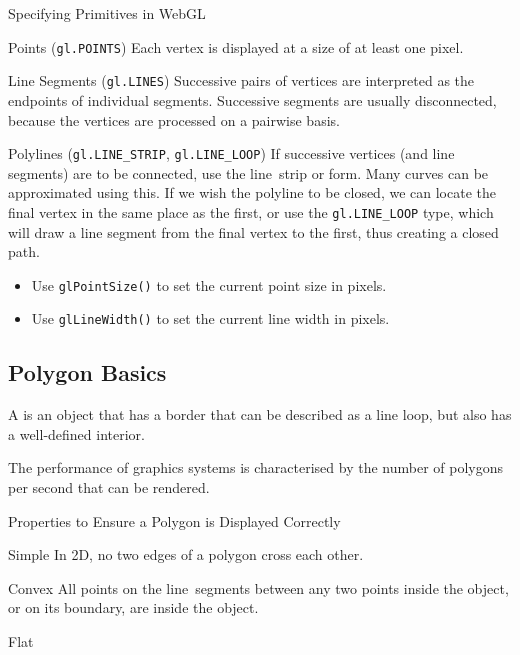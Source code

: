 \documentclass[../notes.tex]{subfiles}
\begin{document}
      \begin{sidenote}{Specifying Primitives in WebGL}
        $ $\vspace{-1em}
        \begin{descriptimize}
          \item[Points (\texttt{gl.POINTS})] Each vertex is displayed
            at a size of at least one pixel.
          \item[Line Segments (\texttt{gl.LINES})] Successive pairs of vertices
            are interpreted as the endpoints of individual segments.
            Successive segments are usually disconnected, because the vertices are processed
            on a pairwise basis.
          \item[Polylines (\texttt{gl.LINE_STRIP}, \texttt{gl.LINE_LOOP})]
            If successive vertices (and line segments) are to be connected,
            use the line~strip or  form.
            Many curves can be approximated using this.
            If we wish the polyline to be closed,
            we can locate the final vertex in the same place as the first,
            or use the \texttt{gl.LINE_LOOP} type,
            which will draw a line segment from the final vertex to the first,
            thus creating a closed path.
        \end{descriptimize}

        \begin{itemize}[nosep]
          \item Use \texttt{glPointSize()} to set the current point size in pixels.
          \item Use \texttt{glLineWidth()} to set the current line width in pixels.
        \end{itemize}
      \end{sidenote}

      \subsection{Polygon Basics}
        A  is an object that has a border that can be described as a line loop,
        but also has a well-defined interior.

        The performance of graphics systems is characterised by the number of polygons
        per second that can be rendered.

        \begin{sidenote}{Properties to Ensure a Polygon is Displayed Correctly}
          $ $\vspace{-1em}
          \begin{descriptimize}[nosep]
            \item[Simple] In 2D, no two edges of a polygon cross each other.
            \item[Convex] All points on the line~segments between any two points
              inside the object, or on its boundary, are inside the object.
            \item[Flat]
          \end{descriptimize}
        \end{sidenote}
\end{document}

